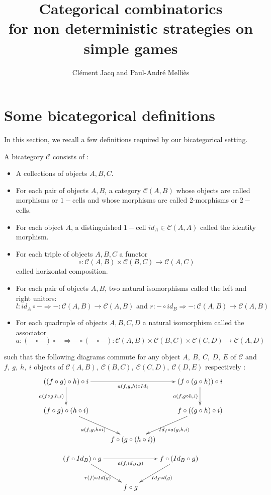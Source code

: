 \documentclass[10pt]{llncs}
\title{Categorical combinatorics\\ for non deterministic strategies on simple games}
\author{Cl\'ement Jacq and Paul-Andr\'e Melli\`es}
\institute{Institut de Recherche en Informatique Fondamentale, Universit\'e Paris Diderot}
\begin{document}
\section{Some bicategorical definitions} 
In this section, we recall a few definitions required by our bicategorical setting. 

\begin{definition}\label{definition/bicategory}
A bicategory $\mathcal{C}$ consists of :
\begin{itemize}
\item A collections of objects $A,B,C$.
\item For each pair of objects $A,B$, a category $\mathcal{C}(A,B)$ whose objects are called morphisms or $1-$cells and whose morphisms are called $2$-morphisms or $2-$cells.
\item For each object $A$, a distinguished $1-$cell $id_A\in \mathcal{C}(A,A)$ called the identity morphism.
\item For each triple of objects $A,B,C$ a functor $$\circ : \mathcal{C}(A,B) \times \mathcal{C}(B,C) \rightarrow \mathcal{C}(A,C)$$ called horizontal composition.
\item For each pair of objects $A,B$, two natural isomorphisms called the left and right unitors: $$l:  id_A \circ - \Rightarrow - :\mathcal{C}(A,B)\rightarrow \mathcal{C}(A,B) \text{ and } r:    - \circ id_B \Rightarrow - :\mathcal{C}(A,B)\rightarrow \mathcal{C}(A,B) $$
\item For each quadruple of objects $A,B,C,D$ a natural isomorphism called the associator $$a: (- \circ -) \circ - \Rightarrow - \circ ( - \circ -): \mathcal{C}(A,B) \times \mathcal{C}(B,C) \times \mathcal{C}(C,D)  \rightarrow \mathcal{C}(A,D)$$
\end{itemize}
such that the following diagrams commute for any object $A,~B,~C,~D,~E$ of $\mathcal{C}$ and $f,~g,~h,~i$ objects of $\mathcal{C}(A,B),~\mathcal{C}(B,C),~\mathcal{C}(C,D),~\mathcal{C}(D,E)$ respectively :
$$\xymatrix @-1.2pc {
((f \circ g) \circ h) \circ i
\ar[rrrr]_-{a(f,g,h) \circ Id_i}
\ar[dd]_-{a(f\circ g, h,i)}
&&&&
(f \circ (g \circ h)) \circ i
\ar[dd]_-{a(f, g \circ h, i)}
\\
\\
(f \circ g) \circ (h \circ i)
\ar[ddrr]_-{a(f,g,h \circ i)}
&&&&
f \circ ((g \circ h) \circ i)
\ar[ddll]^-{ Id_f \circ a(g,h,i)}
\\
\\
&&
f \circ(g \circ (h \circ i))
}
$$




$$
\xymatrix @-1.2pc {
(f \circ Id_B) \circ g
\ar[rrrr]_-{a(f, id_B, g)}
\ar[ddrr]_-{r(f) \circ Id(g) }
&&&&
f \circ (Id_B \circ g)
\ar[ddll]^-{Id_f \circ l(g) }
\\
\\
&&
f \circ g
}
$$

\end{definition}
\end{document}

